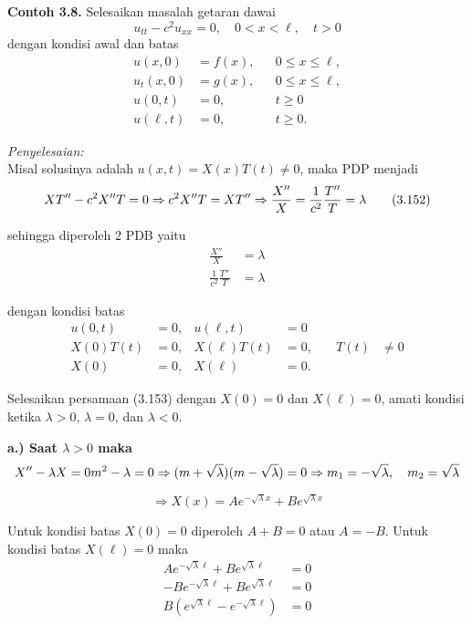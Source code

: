 \documentclass[a4paper]{article}
\theoremstyle{definition}
\begin{document}
\pagestyle{fancy}
\textbf{Contoh 3.8.} Selesaikan masalah getaran dawai
\[
u_{tt} - c^2 u_{xx} = 0,\quad 0 < x < \ell,\quad t > 0
\]
dengan kondisi awal dan batas
\begin{align}
u(x,0) &= f(x), && 0 \leq x \leq \ell, \nonumber\\
u_t(x,0) &= g(x), && 0 \leq x \leq \ell, \nonumber\\
u(0,t) &= 0, && t \geq 0 \nonumber\\
u(\ell,t) &= 0, && t \geq 0. \tag{3.151}
\end{align}

\textit{Penyelesaian:} \\
Misal solusinya adalah \( u(x,t) = X(x)T(t) \ne 0 \), maka PDP menjadi
\[
XT'' - c^2 X''T = 0 \\
\Rightarrow c^2 X''T = XT'' \Rightarrow \frac{X''}{X} = \frac{1}{c^2} \frac{T''}{T} = \lambda \tag{3.152}
\]

sehingga diperoleh 2 PDB yaitu
\begin{align}
\frac{X''}{X} &= \lambda \tag{3.153}\\
\frac{1}{c^2} \frac{T''}{T} &= \lambda \tag{3.154}
\end{align}

dengan kondisi batas
\begin{align}
u(0,t) &= 0, & u(\ell,t) &= 0 \nonumber\\
X(0)T(t) &= 0, & X(\ell)T(t) &= 0,\quad & T(t) &\ne 0 \nonumber\\
X(0) &= 0, & X(\ell) &= 0. \tag{3.155}
\end{align}

Selesaikan persamaan (3.153) dengan \( X(0) = 0 \) dan \( X(\ell) = 0 \), amati kondisi ketika \( \lambda > 0 \), \( \lambda = 0 \), dan \( \lambda < 0 \).

\textbf{a.) Saat \( \lambda > 0 \) maka}
\[
X'' - \lambda X = 0 \\
m^2 - \lambda = 0 \Rightarrow (m + \sqrt{\lambda})(m - \sqrt{\lambda}) = 0 \\
\Rightarrow m_1 = -\sqrt{\lambda},\quad m_2 = \sqrt{\lambda}
\]

\[
\Rightarrow X(x) = Ae^{-\sqrt{\lambda}x} + Be^{\sqrt{\lambda}x} \tag{3.156}
\]

Untuk kondisi batas \( X(0) = 0 \) diperoleh \( A + B = 0 \) atau \( A = -B \). Untuk kondisi batas \( X(\ell) = 0 \) maka
\begin{align*}
Ae^{-\sqrt{\lambda}\ell} + Be^{\sqrt{\lambda}\ell} &= 0 \\
-Be^{-\sqrt{\lambda}\ell} + Be^{\sqrt{\lambda}\ell} &= 0 \\
B(e^{\sqrt{\lambda}\ell} - e^{-\sqrt{\lambda}\ell}) &= 0 \tag{3.157}
\end{align*}
\end{document}
